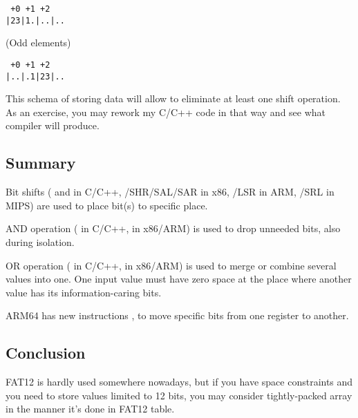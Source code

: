 \begin{lstlisting}
 +0 +1 +2
|23|1.|..|..
\end{lstlisting}

(Odd elements)

\begin{lstlisting}
 +0 +1 +2
|..|.1|23|..
\end{lstlisting}

This schema of storing data will allow to eliminate at least one shift operation.
As an exercise, you may rework my C/C++ code in that way and see what compiler will produce.

\subsection{Summary}

Bit shifts (\TT{<<} and \TT{>>} in C/C++, /{SHR}/{SAL}/{SAR} in x86, /{LSR} in ARM, /{SRL} in MIPS) are used 
to place bit(s) to specific place.

AND operation (\TT{\&} in C/C++,  in x86/ARM) is used to drop unneeded bits, also during isolation.

OR operation (\TT{|} in C/C++,  in x86/ARM) is used to merge or combine several values into one.
One input value must have zero space at the place where another value has its information-caring bits.

ARM64 has new instructions ,  to move specific bits from one register to another.

\subsection{Conclusion}

FAT12 is hardly used somewhere nowadays, but if you have space constraints and you need to store values limited to 12 bits,
you may consider tightly-packed array in the manner it's done in FAT12 table.

